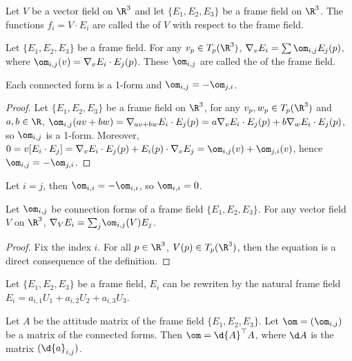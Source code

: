 \documentclass[10pt]{article}
\begin{document}
\begin{definition}
    Let $V$ be a vector field on ${\R}^{3}$ and let $\{{E}_{1},{E}_{2},{E}_{3}\}$ be a frame field on ${\R}^{3}$. The functions ${f}_{i}=V\cdot{E}_{i}$ are called the  of $V$ with respect to the frame field.
\end{definition}
\begin{definition}
    Let $\{{E}_{1},{E}_{2},{E}_{3}\}$ be a frame field. For any ${v}_{p}\in{T}_{p}({\R}^{3})$, ${\nabla}_{v}{E}_{i}=\sum{\om}_{i,j}{E}_{j}(p)$, where ${\om}_{i,j}(v)={\nabla}_{v}{E}_{i}\cdot{E}_{j}(p)$. These ${\om}_{i,j}$ are called the  of the frame field.
\end{definition}
\begin{proposition}
    Each connected form is a 1-form and ${\om}_{i,j}=-{\om}_{j,i}$.
\end{proposition}
\begin{proof}
    Let $\{{E}_{1},{E}_{2},{E}_{3}\}$ be a frame field on ${\R}^{3}$, for any ${v}_{p},{w}_{p}\in{T}_{p}({\R}^{3})$ and $a,b\in\R$, ${\om}_{i,j}(av+bw)={\nabla}_{av+bw}{E}_{i}\cdot{E}_{j}(p)=a{\nabla}_{v}{E}_{i}\cdot{E}_{j}(p)+b{\nabla}_{w}{E}_{i}\cdot{E}_{j}(p)$, so ${\om}_{i,j}$ is a 1-form. Moreover, $0=v[{E}_{i}\cdot{E}_{j}]={\nabla}_{v}{E}_{i}\cdot{E}_{j}(p)+{E}_{i}(p)\cdot{\nabla}_{v}{E}_{j}={\om}_{i,j}(v)+{\om}_{j,i}(v)$, hence ${\om}_{i,j}=-{\om}_{j,i}$.
\end{proof}
\par
Let $i=j$, then ${\om}_{i,i}=-{\om}_{i,i}$, so ${\om}_{i,i}=0$.
\begin{proposition}
    Let ${\om}_{i,j}$ be connection forms of a frame field $\{{E}_{1},{E}_{2},{E}_{3}\}$. For any vector field $V$ on ${\R}^{3}$, ${\nabla}_{V}{E}_{i}={\sum}_{j}{\om}_{i,j}(V){E}_{j}$.
\end{proposition}
\begin{proof}
    Fix the index $i$. For all $p\in{\R}^{3}$, $V(p)\in{T}_{p}({\R}^{3})$, then the equation is a direct consequence of the definition.
\end{proof}
\par
Let $\{{E}_{1},{E}_{2},{E}_{3}\}$ be a frame field, ${E}_{i}$ can be rewriten by the natural frame field ${E}_{i}={a}_{i,1}{U}_{1}+{a}_{i,2}{U}_{2}+{a}_{i,3}{U}_{3}$.
\begin{proposition}
    Let $A$ be the attitude matrix of the frame field $\{{E}_{1},{E}_{2},{E}_{3}\}$. Let $\om=({\om}_{i,j})$ be a matrix of the connected forms. Then $\om=\d{A}^{\top}A$, where $\d A$ is the matrix $(\d{a}_{i,j})$.
\end{proposition}
\end{document}
